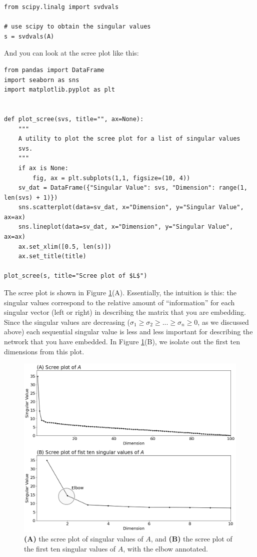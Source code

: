 \begin{lstlisting}[style=python]
from scipy.linalg import svdvals

# use scipy to obtain the singular values
s = svdvals(A)
\end{lstlisting}

And you can look at the scree plot like this:

\begin{lstlisting}[style=python]
from pandas import DataFrame
import seaborn as sns
import matplotlib.pyplot as plt


def plot_scree(svs, title="", ax=None):
    """
    A utility to plot the scree plot for a list of singular values
    svs.
    """
    if ax is None:
        fig, ax = plt.subplots(1,1, figsize=(10, 4))
    sv_dat = DataFrame({"Singular Value": svs, "Dimension": range(1, len(svs) + 1)})
    sns.scatterplot(data=sv_dat, x="Dimension", y="Singular Value", ax=ax)
    sns.lineplot(data=sv_dat, x="Dimension", y="Singular Value", ax=ax)
    ax.set_xlim([0.5, len(s)])
    ax.set_title(title)

plot_scree(s, title="Scree plot of $L$")
\end{lstlisting}

The scree plot is shown in Figure \ref{fig:ch6:scree}(A). Essentially, the intuition is this: the singular values correspond to the relative amount of ``information'' for each singular vector (left or right) in describing the matrix that you are embedding. Since the singular values are decreasing ($\sigma_1 \geq \sigma_2 \geq ... \geq \sigma_n \geq 0$, as we discussed above) each sequential singular value is less and less important for describing the network that you have embedded. In Figure \ref{fig:ch6:scree}(B), we isolate out the first ten dimensions from this plot.

\begin{figure}[h]
    \centering
    \includegraphics[width=\linewidth]{representations/ch6/Images/scree.png}
    \caption[Scree plot of an adjacency spectral embedding]{\textbf{(A)} the scree plot of singular values of $A$, and \textbf{(B)} the scree plot of the first ten singular values of $A$, with the elbow annotated.}
    \label{fig:ch6:scree}
\end{figure}


